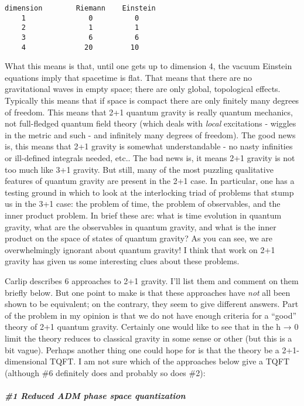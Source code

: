 \documentclass{article}
\begin{document}
\begin{verbatim}
dimension        Riemann    Einstein
    1               0          0
    2               1          1
    3               6          6
    4              20         10  
\end{verbatim}

What this means is that, until one gets up to dimension 4, the vacuum
Einstein equations imply that spacetime is flat. That means that there
are no gravitational waves in empty space; there are only global,
topological effects. Typically this means that if space is compact there
are only finitely many degrees of freedom. This means that 2+1 quantum
gravity is really quantum mechanics, not full-fledged quantum field
theory (which deals with \emph{local} excitations - wiggles in the
metric and such - and infinitely many degrees of freedom). The good news
is, this means that 2+1 gravity is somewhat understandable - no nasty
infinities or ill-defined integrals needed, etc.. The bad news is, it
means 2+1 gravity is not too much like 3+1 gravity. But still, many of
the most puzzling qualitative features of quantum gravity are present in
the 2+1 case. In particular, one has a testing ground in which to look
at the interlocking triad of problems that stump us in the 3+1 case: the
problem of time, the problem of observables, and the inner product
problem. In brief these are: what is time evolution in quantum gravity,
what are the observables in quantum gravity, and what is the inner
product on the space of states of quantum gravity? As you can see, we
are overwhelmingly ignorant about quantum gravity! I think that work on
2+1 gravity has given us some interesting clues about these problems.

Carlip describes 6 approaches to 2+1 gravity. I'll list them and comment
on them briefly below. But one point to make is that these approaches
have \emph{not} all been shown to be equivalent; on the contrary, they
seem to give different answers. Part of the problem in my opinion is
that we do not have enough criteria for a ``good'' theory of 2+1 quantum
gravity. Certainly one would like to see that in the h → 0 limit the
theory reduces to classical gravity in some sense or other (but this is
a bit vague). Perhaps another thing one could hope for is that the
theory be a 2+1-dimensional TQFT. I am not sure which of the approaches
below give a TQFT (although \#6 definitely does and probably so does
\#2):

\hypertarget{reduced-adm-phase-space-quantization}{%
\subparagraph{\#1 Reduced ADM phase space
quantization}\label{reduced-adm-phase-space-quantization}}
\end{document}
